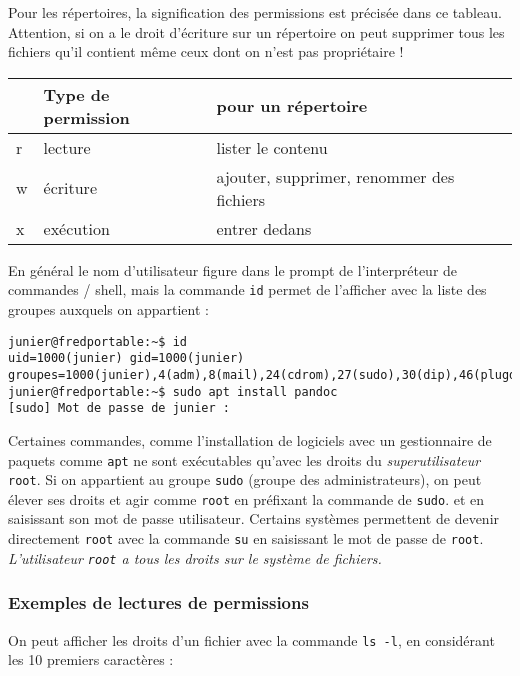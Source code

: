 \documentclass[
  11pt,
]{article}
\newcounter{prop}
\newcounter{logi}
\begin{document}
Pour les répertoires, la signification des permissions est précisée dans
ce tableau. Attention, si on a le droit d'écriture sur un répertoire on
peut supprimer tous les fichiers qu'il contient même ceux dont on n'est
pas propriétaire !

\begin{longtable}[]{@{}lll@{}}
\toprule
& Type de permission & pour un répertoire\tabularnewline
\midrule
\endhead
r & lecture & lister le contenu\tabularnewline
w & écriture & ajouter, supprimer, renommer des fichiers\tabularnewline
x & exécution & entrer dedans\tabularnewline
\bottomrule
\end{longtable}

En général le nom d'utilisateur figure dans le prompt de l'interpréteur
de commandes / shell, mais la commande \texttt{id} permet de l'afficher
avec la liste des groupes auxquels on appartient :

\begin{verbatim}
junier@fredportable:~$ id
uid=1000(junier) gid=1000(junier) groupes=1000(junier),4(adm),8(mail),24(cdrom),27(sudo),30(dip),46(plugdev),120(lpadmin),131(lxd),132(sambashare)
junier@fredportable:~$ sudo apt install pandoc
[sudo] Mot de passe de junier :
\end{verbatim}

Certaines commandes, comme l'installation de logiciels avec un
gestionnaire de paquets comme \texttt{apt} ne sont exécutables qu'avec
les droits du \emph{superutilisateur} \texttt{root}. Si on appartient au
groupe \texttt{sudo} (groupe des administrateurs), on peut élever ses
droits et agir comme \texttt{root} en préfixant la commande de
\texttt{sudo}. et en saisissant son mot de passe utilisateur. Certains
systèmes permettent de devenir directement \texttt{root} avec la
commande \texttt{su} en saisissant le mot de passe de \texttt{root}.
\emph{L'utilisateur \texttt{root} a tous les droits sur le système de
fichiers.}

\hypertarget{exemples-de-lectures-de-permissions}{%
\subsubsection{Exemples de lectures de
permissions}\label{exemples-de-lectures-de-permissions}}

On peut afficher les droits d'un fichier avec la commande
\texttt{ls\ -l}, en considérant les 10 premiers caractères :
\end{document}
